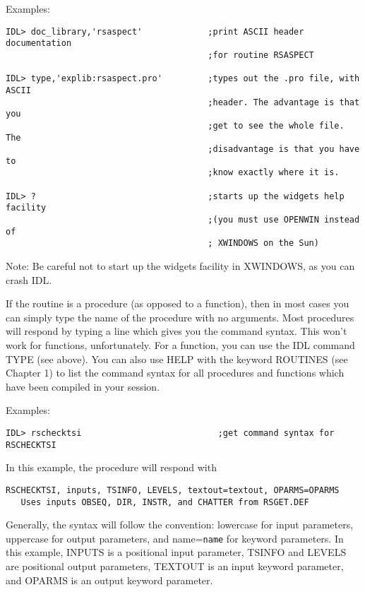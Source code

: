 Examples:

\medskip\noindent
\begin{verbatim}
IDL> doc_library,'rsaspect'             ;print ASCII header documentation
                                        ;for routine RSASPECT
 
IDL> type,'explib:rsaspect.pro'         ;types out the .pro file, with ASCII
                                        ;header. The advantage is that you
                                        ;get to see the whole file. The
                                        ;disadvantage is that you have to
                                        ;know exactly where it is.
 
IDL> ?                                  ;starts up the widgets help facility
                                        ;(you must use OPENWIN instead of
                                        ; XWINDOWS on the Sun)
\end{verbatim}
Note: Be careful not to start up the widgets facility in XWINDOWS, as you can
crash IDL.
 
If the routine is a procedure (as opposed to a function), then in most cases
you can simply type the name of the procedure with no arguments. Most
procedures will respond by typing a line which gives you the command syntax.
This won't work for functions, unfortunately. For a function, you can use the
IDL command TYPE (see above). You can also use HELP with the keyword ROUTINES
(see Chapter 1) to list the command syntax for all procedures and functions
which have been compiled in your session.
 
Examples:

\medskip\noindent
\begin{verbatim}
IDL> rschecktsi                           ;get command syntax for RSCHECKTSI
\end{verbatim}
In this example, the procedure will respond with

\medskip\noindent
\begin{verbatim}
RSCHECKTSI, inputs, TSINFO, LEVELS, textout=textout, OPARMS=OPARMS
   Uses inputs OBSEQ, DIR, INSTR, and CHATTER from RSGET.DEF
\end{verbatim}
Generally, the syntax will follow the convention: lowercase for input
parameters, uppercase for output parameters, and name={\tt name} for keyword
parameters. In this example, INPUTS is a positional input parameter, TSINFO and
LEVELS are positional output parameters, TEXTOUT is an input keyword parameter,
and OPARMS is an output keyword parameter.
 


